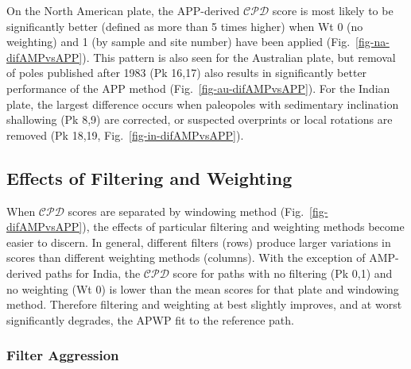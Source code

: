 On the North American plate, the APP-derived $\mathcal{CPD}$ score is most
likely to be significantly better (defined as more than 5 times higher) when
Wt 0 (no weighting) and 1 (by sample and site number) have been
applied (Fig.~\ref{fig-na-difAMPvsAPP}). This pattern is also seen for the
Australian plate, but removal of poles published after 1983 (Pk 16,17) also
results in significantly better performance of the APP method
(Fig.~\ref{fig-au-difAMPvsAPP}). For the Indian plate, the largest difference
occurs when paleopoles with sedimentary inclination shallowing (Pk 8,9) are
corrected, or suspected overprints or local rotations are removed (Pk
18,19, Fig.~\ref{fig-in-difAMPvsAPP}).

\subsection{Effects of Filtering and Weighting}

When $\mathcal{CPD}$ scores are separated by windowing method
(Fig.~\ref{fig-difAMPvsAPP}), the effects of particular filtering and weighting
methods become easier to discern. In general, different filters (rows) produce
larger variations in scores than different weighting methods (columns). With the
exception of AMP-derived paths for India, the $\mathcal{CPD}$ score for paths
with no filtering (Pk 0,1) and no weighting (Wt 0) is lower than the mean scores
for that plate and windowing method. Therefore filtering and weighting at best
slightly improves, and at worst significantly degrades, the APWP fit to the
reference path.

\subsubsection{Filter Aggression}

